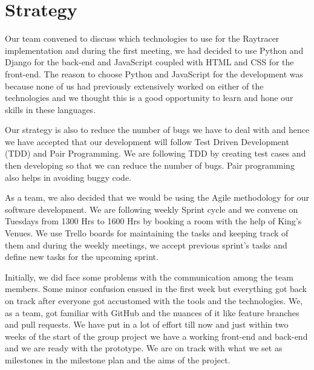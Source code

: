 \section{Strategy}
Our team convened to discuss which technologies to use for the Raytracer implementation and during the first meeting, we had decided to use Python and Django for the back-end and JavaScript coupled with HTML and CSS for the front-end. The reason to choose Python and JavaScript for the development was because none of us had previously extensively worked on either of the technologies and we thought this is a good opportunity to learn and hone our skills in these languages. \par
Our strategy is also to reduce the number of bugs we have to deal with and hence we have accepted that our development will follow Test Driven Development (TDD) and Pair Programming. We are following TDD by creating test cases and then developing so that we can reduce the number of bugs. Pair programming also helps in avoiding buggy code. \par
As a team, we also decided that we would be using the Agile methodology for our software development. We are following weekly Sprint cycle and we convene on Tuesdays from 1300 Hrs to 1600 Hrs by booking a room with the help of King's Venues.
We use Trello boards for maintaining the tasks and keeping track of them and during the weekly meetings, we accept previous sprint's tasks and define new tasks for the upcoming sprint.\par
Initially, we did face some problems with the communication among the team members. Some minor confusion ensued in the first week but everything got back on track after everyone got accustomed with the tools and the technologies. We, as a team, got familiar with GitHub and the nuances of it like feature branches and pull requests. We have put in a lot of effort till now and just within two weeks of the start of the group project we have a working front-end and back-end and we are ready with the prototype. We are on track with what we set as milestones in the milestone plan and the aims of the project.

